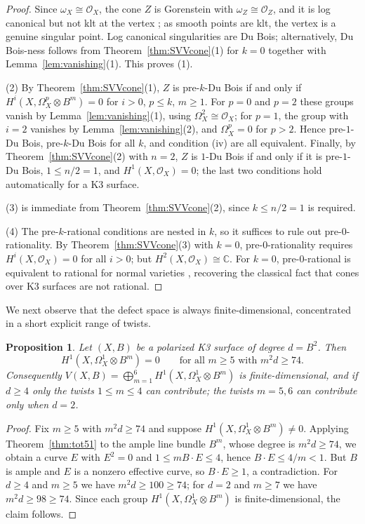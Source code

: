 \documentclass[11pt]{amsart}
\numberwithin{equation}{section}
\theoremstyle{plain}
\newtheorem{proposition}[theorem]{Proposition}
\theoremstyle{definition}
\theoremstyle{remark}
\newcommand{\CC}{\mathbb{C}}
\newcommand{\cO}{\mathcal{O}}
\begin{document}
\begin{proof}
Since $\omega_X\cong\cO_X$, the cone $Z$ is Gorenstein with $\omega_Z\cong\cO_Z$, and it is log canonical but not klt at the vertex \cite[\S3.1]{Kol}; as smooth points are klt, the vertex is a genuine singular point. Log canonical singularities are Du Bois; alternatively, Du Bois-ness follows from Theorem~\ref{thm:SVVcone}(1) for $k=0$ together with Lemma~\ref{lem:vanishing}(1). This proves (1).

(2) By Theorem~\ref{thm:SVVcone}(1), $Z$ is pre-$k$-Du Bois if and only if $H^i(X,\Omega^p_X\otimes B^m)=0$ for $i>0$, $p\le k$, $m\ge1$.
For $p=0$ and $p=2$ these groups vanish by Lemma~\ref{lem:vanishing}(1), using $\Omega^2_X\cong\cO_X$; for $p=1$, the group with $i=2$ vanishes by Lemma~\ref{lem:vanishing}(2), and $\Omega^p_X=0$ for $p>2$.
Hence pre-$1$-Du Bois, pre-$k$-Du Bois for all $k$, and condition (iv) are all equivalent.
Finally, by Theorem~\ref{thm:SVVcone}(2) with $n=2$, $Z$ is $1$-Du Bois if and only if it is pre-$1$-Du Bois, $1\le n/2=1$, and $H^1(X,\cO_X)=0$; the last two conditions hold automatically for a K3 surface.

(3) is immediate from Theorem~\ref{thm:SVVcone}(2), since $k\le n/2=1$ is required.

(4) The pre-$k$-rational conditions are nested in $k$, so it suffices to rule out pre-$0$-rationality.
By Theorem~\ref{thm:SVVcone}(3) with $k=0$, pre-$0$-rationality requires $H^i(X,\cO_X)=0$ for all $i>0$; but $H^2(X,\cO_X)\cong\CC$.
For $k=0$, pre-$0$-rational is equivalent to rational for normal varieties \cite[Prop.~5.5]{SVV}, recovering the classical fact that cones over K3 surfaces are not rational.
\end{proof}

We next observe that the defect space is always finite-dimensional, concentrated in a short explicit range of twists.

\begin{proposition}\label{prop:finiteness}
Let $(X,B)$ be a polarized K3 surface of degree $d=B^2$. Then
\[
H^1(X,\Omega^1_X\otimes B^m)=0 \qquad\text{for all } m\ge5 \text{ with } m^2 d\ge74 .
\]
Consequently $V(X,B)=\bigoplus_{m=1}^{6}H^1(X,\Omega^1_X\otimes B^m)$ is finite-dimensional, and if $d\ge4$ only the twists $1\le m\le4$ can contribute; the twists $m=5,6$ can contribute only when $d=2$.
\end{proposition}

\begin{proof}
Fix $m\ge5$ with $m^2d\ge74$ and suppose $H^1(X,\Omega^1_X\otimes B^m)\ne0$.
Applying Theorem~\ref{thm:tot51} to the ample line bundle $B^m$, whose degree is $m^2d\ge74$, we obtain a curve $E$ with $E^2=0$ and $1\le mB\cdot E\le4$, hence $B\cdot E\le 4/m<1$.
But $B$ is ample and $E$ is a nonzero effective curve, so $B\cdot E\ge1$, a contradiction.
For $d\ge4$ and $m\ge5$ we have $m^2d\ge100\ge74$; for $d=2$ and $m\ge7$ we have $m^2d\ge98\ge74$.
Since each group $H^1(X,\Omega^1_X\otimes B^m)$ is finite-dimensional, the claim follows.
\end{proof}
\end{document}
